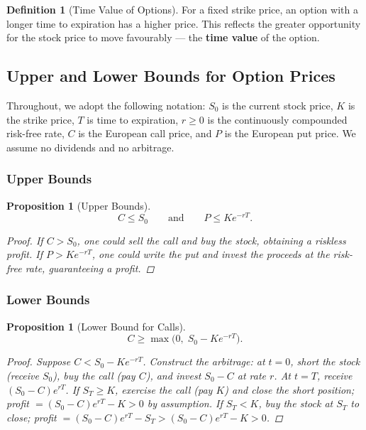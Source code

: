 \documentclass[12pt, a4paper]{article}
\theoremstyle{plain}
\newtheorem{proposition}[theorem]{Proposition}
\theoremstyle{definition}
\newtheorem{definition}[theorem]{Definition}
\theoremstyle{remark}
\begin{document}
\begin{definition}[Time Value of Options]
  For a fixed strike price, an option with a longer time to expiration has a higher price. This reflects the greater opportunity for the stock price to move favourably — the \textbf{time value} of the option.
\end{definition}

\pagebreak
\subsection{Upper and Lower Bounds for Option Prices}

Throughout, we adopt the following notation: $S_0$ is the current stock price, $K$ is the strike price, $T$ is time to expiration, $r \geq 0$ is the continuously compounded risk-free rate, $C$ is the European call price, and $P$ is the European put price. We assume no dividends and no arbitrage.

\subsubsection{Upper Bounds}

\begin{proposition}[Upper Bounds]
  \[
    C \leq S_0 \qquad \text{and} \qquad P \leq Ke^{-rT}.
  \]
  \begin{proof}
    If $C > S_0$, one could sell the call and buy the stock, obtaining a riskless profit. If $P > Ke^{-rT}$, one could write the put and invest the proceeds at the risk-free rate, guaranteeing a profit.
  \end{proof}
\end{proposition}

\subsubsection{Lower Bounds}

\begin{proposition}[Lower Bound for Calls]
  \[
    C \geq \max\!\bigl(0,\; S_0 - Ke^{-rT}\bigr).
  \]
  \begin{proof}
    Suppose $C < S_0 - Ke^{-rT}$. Construct the arbitrage: at $t=0$, short the stock (receive $S_0$), buy the call (pay $C$), and invest $S_0 - C$ at rate $r$. At $t=T$, receive $(S_0 - C)e^{rT}$. If $S_T \geq K$, exercise the call (pay $K$) and close the short position; profit $= (S_0-C)e^{rT} - K > 0$ by assumption. If $S_T < K$, buy the stock at $S_T$ to close; profit $= (S_0-C)e^{rT} - S_T > (S_0-C)e^{rT} - K > 0$.
  \end{proof}
\end{proposition}
\end{document}
